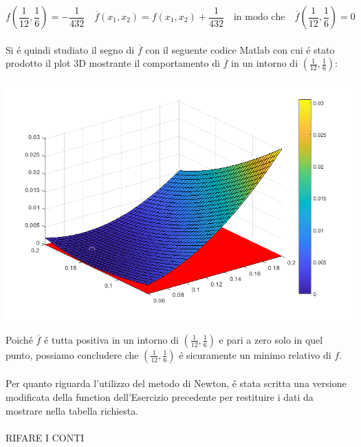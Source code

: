 \[
f(\frac{1}{12}, \frac{1}{6}) = -\frac{1}{432} \quad \overline{f}(x_1,x_2) = f(x_1,x_2) + \frac{1}{432} \quad \text{in modo che} \quad \overline{f}(\frac{1}{12}, \frac{1}{6}) = 0
\]
\\

\noindent Si \'e quindi studiato il segno di \(\overline{f} \) con il seguente codice Matlab con cui \'e stato prodotto il plot 3D mostrante il comportamento di \(\overline{f} \) in un intorno di \((\frac{1}{12}, \frac{1}{6})\):
\\


\begin{center}
	\includegraphics[scale=0.7]{cap3/3_11_sign.png}
\end{center}

\noindent Poich\'e \(\overline{f}\) \'e tutta positiva in un intorno di \((\frac{1}{12}, \frac{1}{6})\) e pari a zero solo in quel punto, possiamo concludere che \((\frac{1}{12}, \frac{1}{6})\) \'e sicuramente un minimo relativo di \(f\).
\\
\\
\noindent Per quanto riguarda l'utilizzo del metodo di Newton, \'e stata scritta una versione modificata della function dell'Esercizio precedente per restituire i dati da mostrare nella tabella richiesta.
\\
\\ RIFARE I CONTI
\\



